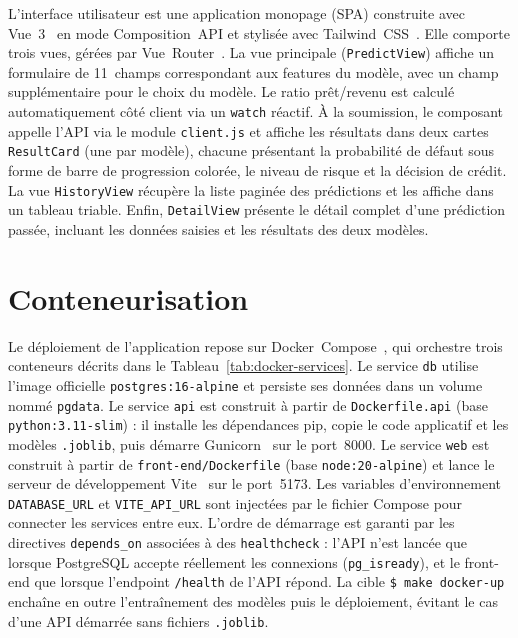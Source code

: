 \documentclass[12pt,a4paper,openany]{report}
\newcommand{\file}[1]{\texttt{#1}}
\newcommand{\cmd}[1]{\texttt{\$ #1}}
\begin{document}
L'interface utilisateur est une application monopage (SPA) construite avec Vue~3~\cite{vuejs} en mode Composition~API et stylisée avec Tailwind~CSS~\cite{tailwindcss}. Elle comporte trois vues, gérées par Vue~Router~\cite{vuerouter}. La vue principale (\texttt{PredictView}) affiche un formulaire de 11~champs correspondant aux features du modèle, avec un champ supplémentaire pour le choix du modèle. Le ratio prêt/revenu est calculé automatiquement côté client via un \texttt{watch} réactif. À la soumission, le composant appelle l'API via le module \file{client.js} et affiche les résultats dans deux cartes \texttt{ResultCard} (une par modèle), chacune présentant la probabilité de défaut sous forme de barre de progression colorée, le niveau de risque et la décision de crédit. La vue \texttt{HistoryView} récupère la liste paginée des prédictions et les affiche dans un tableau triable. Enfin, \texttt{DetailView} présente le détail complet d'une prédiction passée, incluant les données saisies et les résultats des deux modèles.

\section{Conteneurisation}

Le déploiement de l'application repose sur Docker~Compose~\cite{dockercompose}, qui orchestre trois conteneurs décrits dans le Tableau~\ref{tab:docker-services}. Le service \texttt{db} utilise l'image officielle \texttt{postgres:16-alpine} et persiste ses données dans un volume nommé \texttt{pgdata}. Le service \texttt{api} est construit à partir de \file{Dockerfile.api} (base \texttt{python:3.11-slim}) : il installe les dépendances pip, copie le code applicatif et les modèles \texttt{.joblib}, puis démarre Gunicorn~\cite{gunicorn} sur le port~8000. Le service \texttt{web} est construit à partir de \file{front-end/Dockerfile} (base \texttt{node:20-alpine}) et lance le serveur de développement Vite~\cite{vite} sur le port~5173. Les variables d'environnement \texttt{DATABASE\_URL} et \texttt{VITE\_API\_URL} sont injectées par le fichier Compose pour connecter les services entre eux. L'ordre de démarrage est garanti par les directives \texttt{depends\_on} associées à des \texttt{healthcheck} : l'API n'est lancée que lorsque PostgreSQL accepte réellement les connexions (\texttt{pg\_isready}), et le front-end que lorsque l'endpoint \texttt{/health} de l'API répond. La cible \cmd{make docker-up} enchaîne en outre l'entraînement des modèles puis le déploiement, évitant le cas d'une API démarrée sans fichiers \texttt{.joblib}.
\end{document}
